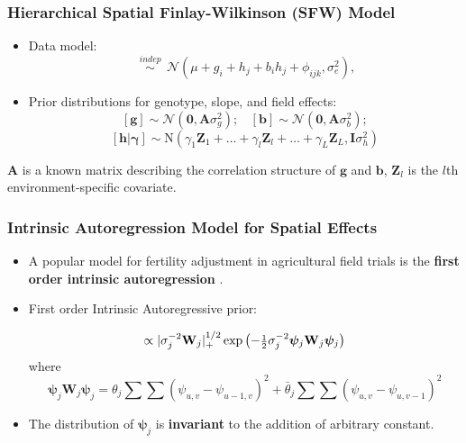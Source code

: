 \documentclass{beamer}
\newcommand{\bA}{\mathbf{A}}
\newcommand{\bphi}{{\bm\phi}}
\newcommand{\bpsi}{{\bm\psi}}
\newcommand{\bW}{\mathbf{W}}
\newcommand{\bZ}{\mathbf{Z}}
\newcommand{\shalf}{\mbox{{\footnotesize$\frac{1}{2}$}}}
\begin{document}
\begin{frame}
	\frametitle{Hierarchical Spatial Finlay-Wilkinson (SFW) Model}
	\begin{itemize}
	\item Data model:
\begin{equation*}
[y_{ijk} | \mu, \mathbf{g}, \mathbf{b}, \mathbf{h}, \bphi ] \ \ \overset{indep}{\sim} \ \  \mathcal{N}(\mu + g_i + h_j + b_i h_j + \phi_{ijk}, \sigma_e^2),
\end{equation*}

	\item Prior distributions for genotype, slope, and field effects:
	$$  [\mathbf{g}] \sim \mathcal{N}(\bm{0}, \bA \sigma_g^2); \ \ \ \ [\mathbf{b}] \sim \mathcal{N}(\bm{0}, \bA \sigma_b^2); $$
        $$[\mathbf{h}|\bm{\gamma}] \sim \mathrm{N}( \gamma_1 \bZ_1 + \dots + \gamma_l \bZ_l + \dots + \gamma_L \bZ_L
         , \mathbf{I} \sigma_h^2)$$
	\end{itemize}
	$\bA$ is a known matrix describing the correlation structure of $\mathbf{g}$ and $\mathbf{b}$, $\bZ_{l}$ is the $l$th environment-specific covariate.
\end{frame}


\begin{frame}
	\frametitle{Intrinsic Autoregression Model for Spatial Effects}
	\begin{itemize}
	\item A popular model for fertility adjustment in agricultural field trials is the \textbf{first order intrinsic autoregression} \citep{besag1999bayesian,dutt:mond:2015}.

\item First order Intrinsic Autoregressive prior:

\begin{equation*}
[\bpsi_j|\theta_j,\sigma^2_j] \propto |\sigma^{-2}_j\bW_j|_+^{1/2}\exp\left( -\shalf\sigma^{-2}_j\bpsi_j\bW_j\bpsi_j\right)
\end{equation*}
where
\[\bpsi_j\bW_j\bpsi_j = \theta_j\sum\sum(\psi_{u,v} - \psi_{u-1,v})^2 + {\bar\theta}_j\sum\sum(\psi_{u,v} - \psi_{u,v-1})^2\]

\item  The distribution of $\pmb{\psi}_j$ is \textbf{invariant} to the addition of arbitrary constant.

	\end{itemize}

\end{frame}
\end{document}
